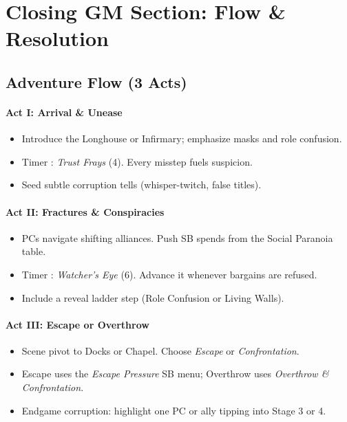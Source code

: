 \documentclass[11pt]{article}
\begin{document}
\section{Closing GM Section: Flow \& Resolution}

\subsection{Adventure Flow (3 Acts)}

\paragraph{Act I: Arrival \& Unease}
\begin{itemize}
  \item Introduce the Longhouse or Infirmary; emphasize masks and role confusion.
  \item Timer : \emph{Trust Frays} (4). Every misstep fuels suspicion.
  \item Seed subtle corruption tells (whisper-twitch, false titles).
\end{itemize}

\paragraph{Act II: Fractures \& Conspiracies}
\begin{itemize}
  \item PCs navigate shifting alliances. Push SB spends from the Social Paranoia table.
  \item Timer : \emph{Watcher's Eye} (6). Advance it whenever bargains are refused.
  \item Include a reveal ladder step (Role Confusion or Living Walls).
\end{itemize}

\paragraph{Act III: Escape or Overthrow}
\begin{itemize}
  \item Scene pivot to Docks or Chapel. Choose \emph{Escape} or \emph{Confrontation}.
  \item Escape uses the \emph{Escape Pressure} SB menu; Overthrow uses \emph{Overthrow \& Confrontation}.
  \item Endgame corruption: highlight one PC or ally tipping into Stage 3 or 4.
\end{itemize}
\end{document}
